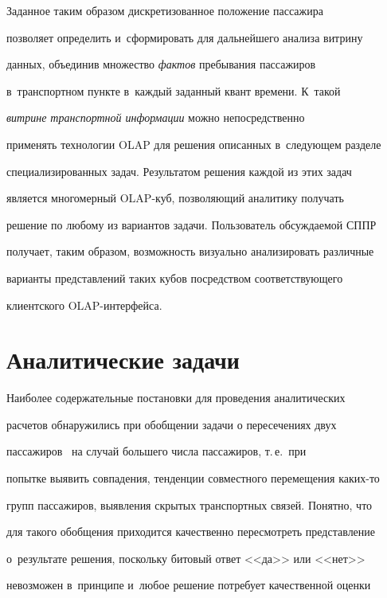       


      Заданное таким образом дискретизованное положение пассажира 


позволяет определить и~сформировать для дальнейшего анализа витрину 


данных, объединив множество \textit{фактов} пребывания пассажиров 


в~транспортном пункте в~каждый заданный квант времени. К~такой 


\textit{витрине транспортной информации} можно непосредственно 


применять технологии OLAP для решения описанных в~следующем разделе 


специализированных задач. Результатом решения каждой из этих задач 


является многомерный OLAP-куб, позволяющий аналитику получать 


решение по любому из вариантов задачи. Пользователь обсуждаемой СППР 


получает, таким образом, возможность визуально анализировать различные 


варианты представлений таких кубов посредством соответствующего 


клиентского OLAP-ин\-тер\-фейса.





\section{Аналитические задачи}





      Наиболее содержательные постановки для проведения аналитических 


расчетов обнаружились при обобщении задачи о пересечениях двух 


пассажиров~\cite{3-bi} на случай большего числа пассажиров, т.\,е.\ при 


попытке выявить совпадения, тенденции совместного перемещения ка\-ких-то 


групп пассажиров, выявления скрытых транспортных связей. Понятно, что 


для такого обобщения приходится качественно пересмотреть представление 


о~результате решения, поскольку битовый ответ <<да>> или <<нет>> 


невозможен в~принципе и~любое решение потребует качественной оценки 


